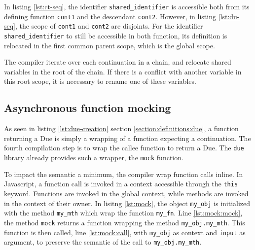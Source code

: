 
In listing \ref{lst:ct-seq}, the identifier \texttt{shared\_identifier} is accessible both from its defining function \texttt{cont1} and the descendant \texttt{cont2}.
However, in listing \ref{lst:du-seq}, the scope of \texttt{cont1} and \texttt{cont2} are disjoints.
For the identifier \texttt{shared\_identifier} to still be accessible in both function, its definition is relocated in the first common parent scope, which is the global scope.

The compiler iterate over each continuation in a chain, and  relocate shared variables in the root of the chain.
If there is a conflict with another variable in this root scope, it is necessary to rename one of these variables.

\subsection{Asynchronous function mocking} \label{section:limits:mock}

As seen in listing \ref{lst:due-creation} section \ref{section:definitions:due}, a function returning a Due is simply a wrapping of a function expecting a continuation.
The fourth compilation step is to wrap the callee function to return a Due.
The \texttt{due} library already provides such a wrapper, the \texttt{mock} function.

To impact the semantic a minimum, the compiler wrap function calls inline.
In Javascript, a function call is invoked in a context accessible through the \texttt{this} keyword.
Functions are invoked in the global context, while methods are invoked in the context of their owner.
In lisitng \ref{lst:mock}, the object \texttt{my_obj} is initialized with the method \texttt{my_mth} which wrap the function \texttt{my_fn}.
Line \ref{lst:mock:mock}, the method \texttt{mock} returns a function wrapping the method \texttt{my_obj.my_mth}.
This function is then called, line \ref{lst:mock:call}, with \texttt{my_obj} as context and \texttt{input} as argument, to preserve the semantic of the call to \texttt{my_obj.my_mth}.

